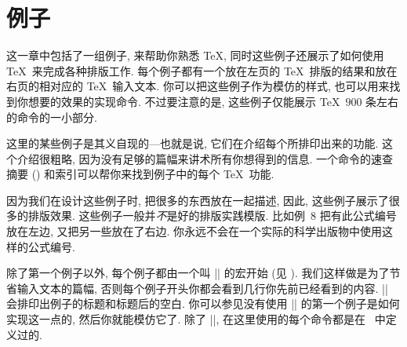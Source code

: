 

\chapter{例子}



这一章中包括了一组例子, 来帮助你熟悉 \TeX, 同时这些例子还展示了如何使用 \TeX\ 来完成各种排版工作.
每个例子都有一个放在左页的 \TeX\ 排版的结果和放在右页的相对应的 \TeX\ 输入文本.
你可以把这些例子作为模仿的样式, 也可以用来找到你想要的效果的实现命令.
不过要注意的是, 这些例子仅能展示 \TeX\ $900$ 条左右的命令的一小部分.

这里的某些例子是其义自现的---也就是说, 它们在介绍每个所排印出来的功能.
这个介绍很粗略, 因为没有足够的篇幅来讲术所有你想得到的信息.
一个命令的速查摘要 () 和索引可以帮你来找到例子中的每个 \TeX\ 功能.

因为我们在设计这些例子时, 把很多的东西放在一起描述,
因此, 这些例子展示了很多的排版效果.
这些例子一般并\emph{不}是好的排版实践模版.
比如例~8 把有此公式编号放在左边, 又把另一些放在了右边.
你永远不会在一个实际的科学出版物中使用这样的公式编号.

除了第一个例子以外, 每个例子都由一个叫 |\xmpheader| 的宏开始 (见 ).
我们这样做是为了节省输入文本的篇幅,
否则每个例子开头你都会看到几行你先前已经看到的内容.
|\xmpheader| 会排印出例子的标题和标题后的空白.
你可以参见没有使用 |\xmpheader| 的第一个例子是如何实现这一点的,
然后你就能模仿它了.
除了 |\xmpheader|, 在这里使用的每个命令都是在 \plainTeX\ 中定义过的.

{%
   \let\bye = \relax %
}%


\endchapter
\byebye
